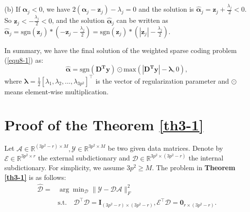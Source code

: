 (b) If $\bm{\alpha}_{j}< 0$, we have
$
2(\bm{\alpha}_{j}-\bm{z}_{j})-\lambda_{j}=0
$
and the solution is
$
\hat{\bm{\alpha}}_{j}=\bm{z}_{j}+\frac{\lambda_{j}}{2} < 0.
$
So $\bm{z}_{j}<-\frac{\lambda_{j}}{2}< 0$, and the solution $\hat{\bm{\alpha}}_{j}$ can be written as
$
\hat{\bm{\alpha}}_{j}=\text{sgn}(\bm{z}_{j})*(-\bm{z}_{j}-\frac{\lambda_{j}}{2})=\text{sgn}(\bm{z}_{j})*(|\bm{z}_{j}|-\frac{\lambda_{j}}{2}).
$

In summary, we have the final solution of the weighted sparse coding problem (\ref{equ8-1}) as:
\begin{equation}
\label{equ8-5}
\hat{\bm{\alpha}}= \text{sgn}(\bm{D^{T}y})\odot \text{max}(|\bm{D^{T}y}|-\bm{\lambda},0),
\end{equation}
where $\bm{\lambda} = \frac{1}{2}[\lambda_{1},\lambda_{2},...,\lambda_{3p^2}]^{\top}$ is the vector of regularization parameter and $\odot$ means element-wise multiplication.

\section{Proof of the Theorem \ref{th3-1}}

Let $\mathcal{A}\in \mathbb{R}^{(3p^2-r)\times M},\mathcal{Y}\in \mathbb{R}^{3p^2\times M}$ be two given data matrices. Denote by $\mathcal{E}\in\mathbb{R}^{3p^2\times r}$ the external subdictionary and $\mathcal{D}\in\mathbb{R}^{3p^2\times (3p^2-r)}$ the internal subdictionary. For simplicity, we assume $3p^2\ge M$. The problem in \textbf{Theorem \ref{th3-1}} is as follows:
\begin{equation}
\label{equ8-6}
\begin{split}
\hat{\mathcal{D}}
=
&
\arg\min\nolimits_{\mathcal{D}}\|\mathcal{Y}-\mathcal{D}\mathcal{A}\|_{F}^{2}
\\
&
\text{s.t.}
\quad
\mathcal{D}^{\top}\mathcal{D} = \bm{I}_{(3p^2-r)\times (3p^2-r)}, \mathcal{E}^{\top}\mathcal{D} = \bm{0}_{r\times (3p^2-r)}.
\end{split}
\end{equation} 

